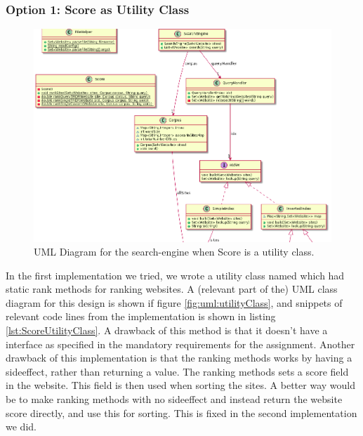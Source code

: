 \subsubsection{Option 1: Score as Utility Class}
\begin{figure}[t]
	\centering
	\includegraphics[width=\textwidth]{graphics/uml/ScoreAsUtilityZoom.png}
	\caption{UML Diagram for the search-engine when Score is a utility class.}
	\label{fig:uml:ScoreAsUtility}
\end{figure}

In the first implementation we tried, we wrote a utility class named  which had static rank methods for ranking websites.   
A (relevant part of the) UML class diagram for this design is shown if figure \ref{fig:uml:utilityClass}, and snippets of relevant code lines from the implementation is shown in listing \ref{lst:ScoreUtilityClass}. 
A drawback of this method is that it doesn't have a  interface as specified in the mandatory requirements for the assignment.
Another drawback of this implementation is that the ranking methods works by having a sideeffect, rather than returning a value. The ranking methods sets a score field in the website. This field is then used when sorting the sites. A better way would be to make ranking methods with no sideeffect and instead return the website score directly, and use this for sorting. This is fixed in the second implementation we did.      

